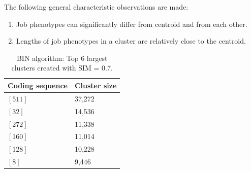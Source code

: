\documentclass{jhps}
\begin{document}
The following general characteristic observations are made:
\begin{enumerate}
 \item Job phenotypes can significantly differ from centroid and from each other.
 \item Lengths of job phenotypes in a cluster are relatively close to the centroid.
\end{enumerate}

\begin{table}
	\centering
	\begin{tabular}{ll}
		Coding sequence & Cluster size \\
		\midrule
		$[511]$ & 37,272 \\
		$[32]$  & 14,536 \\
		$[272]$ & 11,338 \\
		$[160]$ & 11,014 \\
		$[128]$ & 10,228 \\
		$[8]$   & 9,446  \\
	\end{tabular}
	\caption{BIN algorithm: Top 6 largest clusters created with SIM = 0.7.}
	\label{tab:bin:largest_clusters}
\end{table}
\end{document}
